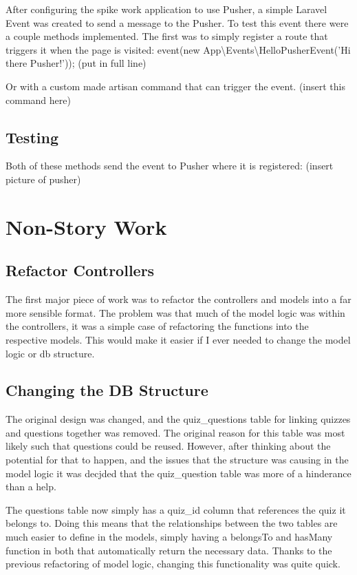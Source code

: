 \documentclass{article}
\begin{document}
After configuring the spike work application to use Pusher, a simple Laravel Event was created to send a message to the Pusher. To test this event there were a couple methods implemented. The first was to simply register a route that triggers it when the page is visited: 
	event(new App\textbackslash Events\textbackslash HelloPusherEvent('Hi there Pusher!')); (put in full line)
 
Or with a custom made artisan command that can trigger the event. (insert this command here)
 
\subsection{Testing}
Both of these methods send the event to Pusher where it is registered: (insert picture of pusher)
\newpage

\section{Non-Story Work}
\subsection{Refactor Controllers}
The first major piece of work was to refactor the controllers and models into a far more sensible format. The problem was that much of the model logic was within the controllers, it was a simple case of refactoring the functions into the respective models. This would make it easier if I ever needed to change the model logic or db structure.
\subsection{Changing the DB Structure}
The original design was changed, and the quiz\_questions table for linking quizzes and questions together was removed. The original reason for this table was most likely such that questions could be reused. However, after thinking about the potential for that to happen, and the issues that the structure was causing in the model logic it was decjded that the quiz\_question table was more of a hinderance than a help.

The questions table now simply has a quiz\_id column that references the quiz it belongs to. Doing this means that the relationships between the two tables are much easier to define in the models, simply having a belongsTo and hasMany function in both that automatically return the necessary data. Thanks to the previous refactoring of model logic, changing this functionality was quite quick.
\end{document}
